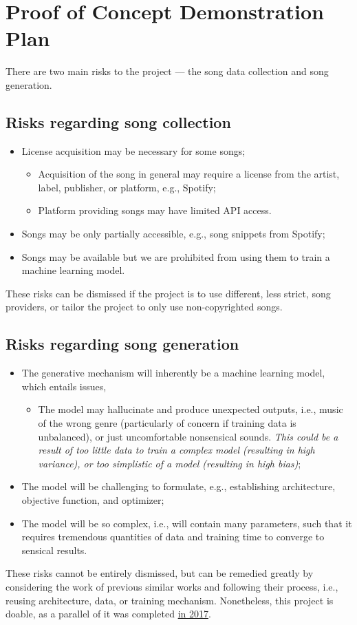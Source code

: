 \documentclass{article}
\begin{document}
\section{Proof of Concept Demonstration Plan}
There are two main risks to the project --- the song data collection and song generation.

\subsection{Risks regarding song collection}
\begin{itemize}
  \item License acquisition may be necessary for some songs;
  \begin{itemize}
    \item Acquisition of the song in general may require a license from the artist, label, publisher, or platform, e.g., Spotify;
    \item Platform providing songs may have limited API access.
  \end{itemize}
  \item Songs may be only partially accessible, e.g., song snippets from Spotify;
  \item Songs may be available but we are prohibited from using them to train a machine learning model.
\end{itemize}
These risks can be dismissed if the project is to use different, less strict, song providers, or tailor the project to only use non-copyrighted songs.

\subsection{Risks regarding song generation}
\begin{itemize}
  \item The generative mechanism will inherently be a machine learning model, which entails issues,
  \begin{itemize}
    \item The model may hallucinate and produce unexpected outputs, i.e., music of the wrong genre (particularly of concern if training data is unbalanced), or just uncomfortable nonsensical sounds. \emph{This could be a result of too little data to train a complex model (resulting in high variance), or too simplistic of a model (resulting in high bias)};
  \end{itemize}
  \item The model will be challenging to formulate, e.g., establishing architecture, objective function, and optimizer;
  \item The model will be so complex, i.e., will contain many parameters, such that it requires tremendous quantities of data and training time to converge to sensical results.
\end{itemize}
These risks cannot be entirely dismissed, but can be remedied greatly by considering the work of previous similar works and following their process, i.e., reusing architecture, data, or training mechanism. Nonetheless, this project is doable, as a parallel of it was completed \href{https://www.reddit.com/r/MachineLearning/comments/6476kj/projectmusic_generated_using_my_rnn_some_bach/}{in 2017}.
\end{document}
